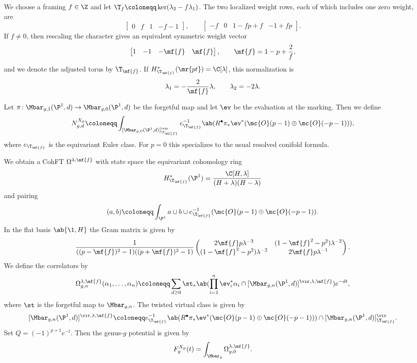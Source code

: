 We choose a framing \(f \in \Z\) and let \(\T_f \coloneqq \ker(\lambda_2 - f\lambda_1)\). The two localized weight rows, each of which includes one zero weight, are
\[ \begin{bmatrix} 0 & f & 1 & -f-1 \end{bmatrix}, \qquad \begin{bmatrix} -f & 0 & 1-fp+f & -1+fp \end{bmatrix}. \]
If \(f \neq 0\), then rescaling the character gives an equivalent symmetric weight vector
\[ \begin{bmatrix} 1 & -1 & -\mf{f} & \mf{f} \end{bmatrix}, \qquad \mf{f} = 1-p+\frac{2}{f}, \]
and we denote the adjusted torus by \(\T_{\mf{f}}\). If \(H^*_{\T_{\mf{f}}}(\mr{pt}) = \C[\lambda]\), this normalization is
\[ \lambda_1 = -\frac{2}{\mf{f}}\lambda, \qquad \lambda_2 = -2\lambda. \]

Let \(\pi \colon \Mbar_{g,1}(\P^1,d) \to \Mbar_{g,0}(\P^1,d)\) be the forgetful map and let \(\ev\) be the evaluation at the marking. Then we define
\[ N^{X_p}_{g,d} \coloneqq \int_{[\Mbar_{g,0}(\P^1,d)]^{\vir}_{\T_{\mf{f}}}} e_{\T_{\mf{f}}}^{-1}\ab(R^{\bullet}\pi_* \ev^*(\mc{O}(p-1)\oplus\mc{O}(-p-1))), \]
where \(e_{\T_{\mf{f}}}\) is the equivariant Euler class. For \(p=0\) this specializes to the usual resolved conifold formula.

We obtain a CohFT \(\Omega^{\lambda,\mf{f}}\) with state space the equivariant cohomology ring
\[ H^*_{\T_{\mf{f}}}(\P^1) = \frac{\C[H,\lambda]}{(H+\lambda)(H-\lambda)} \]
and pairing
\[ (a,b) \coloneqq \int_{\P^1} a \cup b \cup e^{-1}_{\T_{\mf{f}}}(\mc{O}(p-1)\oplus\mc{O}(-p-1)). \]
In the flat basis \(\ab\{\1,H\}\) the Gram matrix is given by
\[ \frac{1}{((p-\mf{f})^2-1)((p+\mf{f})^2-1)}\begin{pmatrix} 2\mf{f}p\lambda^{-3} & (1-\mf{f}^2-p^2)\lambda^{-2} \\ (1-\mf{f}^2-p^2)\lambda^{-2} & 2\mf{f}p\lambda^{-1} \end{pmatrix}. \]
We define the correlators by
\[ \Omega^{\lambda,\mf{f}}_{g,n}(\alpha_1,\ldots,\alpha_n) \coloneqq \sum_{d\geq0}\st_*\ab(\prod_{i=1}^n \ev_i^*\alpha_i \cap [\Mbar_{g,n}(\P^1,d)]^{\vir,\lambda,\mf{f}})e^{-dt}, \]
where \(\st\) is the forgetful map to \(\Mbar_{g,n}\). The twisted virtual class is given by
\[ [\Mbar_{g,n}(\P^1,d)]^{\vir,\lambda,\mf{f}} \coloneqq e^{-1}_{\T_{\mf{f}}}\ab(R^{\bullet}\pi_*\ev^*(\mc{O}(p-1)\oplus\mc{O}(-p-1))) \cap [\Mbar_{g,n}(\P^1,d)]^{\vir}_{\T_{\mf{f}}}. \]
Set \(Q = (-1)^{p+1}e^{-t}\). Then the genus-\(g\) potential is given by
\[ F^{X_p}_g(t) = \int_{\Mbar_g} \Omega^{\lambda,\mf{f}}_{g,0}. \]

